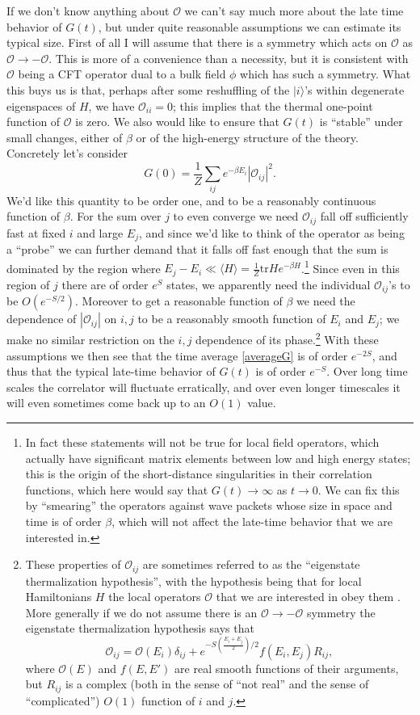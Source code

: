 \documentclass[12pt]{article}
\newcommand{\be}{\begin{equation}}
\newcommand{\ee}{\end{equation}}
\newcommand{\lan}{\langle}
\newcommand{\ran}{\rangle}
\newcommand{\tr}{\mathrm{tr}}
\newcommand{\mO}{\mathcal{O}}
\begin{document}
If we don't know anything about $\mO$ we can't say much more about the late time behavior of $G(t)$, but under quite reasonable assumptions we can estimate its typical size.  First of all I will assume that there is a symmetry which acts on $\mO$ as $\mO \to-\mO$.  This is more of a convenience than a necessity, but it is consistent with $\mO$ being a CFT operator dual to a bulk field $\phi$ which has such a symmetry.  What this buys us is that, perhaps after some reshuffling of the $|i\ran$'s within degenerate eigenspaces of $H$, we have $\mO_{ii}=0$; this implies that the thermal one-point function of $\mO$ is zero.  We also would like to ensure that $G(t)$ is ``stable'' under small changes, either of $\beta$ or of the high-energy structure of the theory.  Concretely let's consider
\be
G(0)=\frac{1}{Z}\sum_{ij}e^{-\beta E_i}|\mO_{ij}|^2.
\ee
We'd like this quantity to be order one, and to be a reasonably continuous function of $\beta$.  For the sum over $j$ to even converge we need $\mO_{ij}$ fall off sufficiently fast at fixed $i$ and large $E_j$, and since we'd like to think of the operator as being a ``probe'' we can further demand that it falls off fast enough that the sum is dominated by the region where $E_j-E_i\ll \lan H\ran=\frac{1}{Z}\tr H e^{-\beta H}$.\footnote{In fact these statements will not be true for local field operators, which  actually have significant matrix elements between low and high energy states; this is the origin of the short-distance singularities in their correlation functions, which here would say that $G(t)\to\infty$ as $t\to 0$.  We can fix this by ``smearing'' the operators against wave packets whose size in space and time is of order $\beta$, which will not affect the late-time behavior that we are interested in.}  Since even in this region of $j$ there are of order $e^{S}$ states, we apparently need the individual $\mO_{ij}$'s to be $O(e^{-S/2})$.  Moreover to get a reasonable function of $\beta$ we need the dependence of $|\mO_{ij}|$ on $i,j$ to be a reasonably smooth function of $E_i$ and $E_j$; we make no similar restriction on the $i,j$ dependence of its phase.\footnote{These properties of $\mO_{ij}$ are sometimes referred to as the ``eigenstate thermalization hypothesis'', with the hypothesis being that for local Hamiltonians $H$ the local operators $\mO$ that we are interested in obey them \cite{deutsch1991quantum,Srednicki:1995pt}.  More generally if we do not assume there is an $\mO\to-\mO$ symmetry the eigenstate thermalization hypothesis says that
\be
\mO_{ij}=\mO(E_i)\delta_{ij}+e^{-S\left(\frac{E_{i}+E_{j}}{2}\right)/2}f(E_i,E_j)R_{ij},
\ee
where $\mO(E)$ and $f(E,E')$ are real smooth functions of their arguments, but $R_{ij}$ is a complex (both in the sense of ``not real'' and the sense of ``complicated'') $O(1)$ function of $i$ and $j$.}  With these assumptions we then see that the time average \eqref{averageG} is of order $e^{-2S}$, and thus that the typical late-time behavior of $G(t)$ is of order $e^{-S}$.  Over long time scales the correlator will fluctuate erratically, and over even longer timescales it will even sometimes come back up to an $O(1)$ value.
\end{document}
